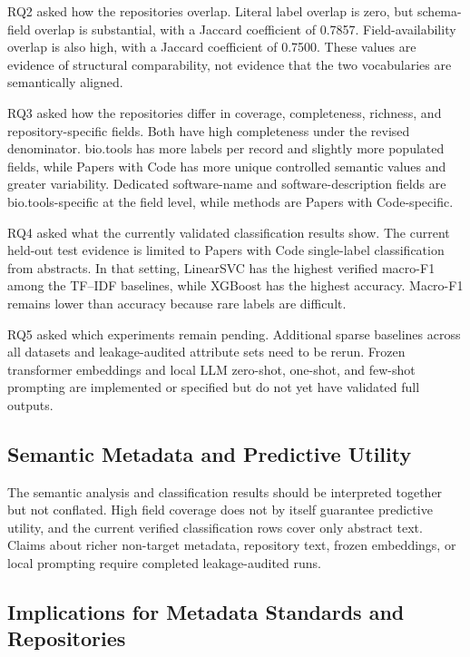 \documentclass[pdflatex,sn-mathphys-num]{sn-jnl}
\theoremstyle{thmstyleone}%
\theoremstyle{thmstyletwo}%
\theoremstyle{thmstylethree}%
\begin{document}
RQ2 asked how the repositories overlap. Literal label overlap is zero, but schema-field overlap is substantial, with a Jaccard coefficient of 0.7857. Field-availability overlap is also high, with a Jaccard coefficient of 0.7500. These values are evidence of structural comparability, not evidence that the two vocabularies are semantically aligned.

RQ3 asked how the repositories differ in coverage, completeness, richness, and repository-specific fields. Both have high completeness under the revised denominator. bio.tools has more labels per record and slightly more populated fields, while Papers with Code has more unique controlled semantic values and greater variability. Dedicated software-name and software-description fields are bio.tools-specific at the field level, while methods are Papers with Code-specific.

RQ4 asked what the currently validated classification results show. The current held-out test evidence is limited to Papers with Code single-label classification from abstracts. In that setting, LinearSVC has the highest verified macro-F1 among the TF--IDF baselines, while XGBoost has the highest accuracy. Macro-F1 remains lower than accuracy because rare labels are difficult.

RQ5 asked which experiments remain pending. Additional sparse baselines across all datasets and leakage-audited attribute sets need to be rerun. Frozen transformer embeddings and local LLM zero-shot, one-shot, and few-shot prompting are implemented or specified but do not yet have validated full outputs.

\subsection{Semantic Metadata and Predictive Utility}
\label{subsec:discussion-semantic-predictive}

The semantic analysis and classification results should be interpreted together but not conflated. High field coverage does not by itself guarantee predictive utility, and the current verified classification rows cover only abstract text. Claims about richer non-target metadata, repository text, frozen embeddings, or local prompting require completed leakage-audited runs.

\subsection{Implications for Metadata Standards and Repositories}
\label{subsec:discussion-standards}
\end{document}
